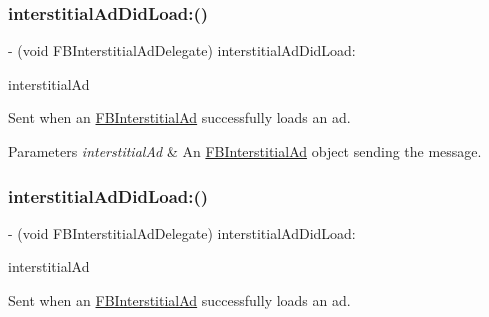\subsubsection{\texorpdfstring{interstitial\+Ad\+Did\+Load\+:()}{interstitialAdDidLoad:()}\hspace{0.1cm}{\footnotesize\ttfamily [1/5]}}
{\footnotesize\ttfamily -\/ (void F\+B\+Interstitial\+Ad\+Delegate) interstitial\+Ad\+Did\+Load\+: \begin{DoxyParamCaption}\item[{(\hyperlink{interfaceFBInterstitialAd}{F\+B\+Interstitial\+Ad} $\ast$)}]{interstitial\+Ad }\end{DoxyParamCaption}\hspace{0.3cm}{\ttfamily [optional]}}

Sent when an \hyperlink{interfaceFBInterstitialAd}{F\+B\+Interstitial\+Ad} successfully loads an ad.


\begin{DoxyParams}{Parameters}
{\em interstitial\+Ad} & An \hyperlink{interfaceFBInterstitialAd}{F\+B\+Interstitial\+Ad} object sending the message. \\
\hline
\end{DoxyParams}
\mbox{\label{protocolFBInterstitialAdDelegate_01-p_a6e42af81b5d6382056651aee8b71c720}} 
\subsubsection{\texorpdfstring{interstitial\+Ad\+Did\+Load\+:()}{interstitialAdDidLoad:()}\hspace{0.1cm}{\footnotesize\ttfamily [2/5]}}
{\footnotesize\ttfamily -\/ (void F\+B\+Interstitial\+Ad\+Delegate) interstitial\+Ad\+Did\+Load\+: \begin{DoxyParamCaption}\item[{(\hyperlink{interfaceFBInterstitialAd}{F\+B\+Interstitial\+Ad} $\ast$)}]{interstitial\+Ad }\end{DoxyParamCaption}\hspace{0.3cm}{\ttfamily [optional]}}

Sent when an \hyperlink{interfaceFBInterstitialAd}{F\+B\+Interstitial\+Ad} successfully loads an ad.


